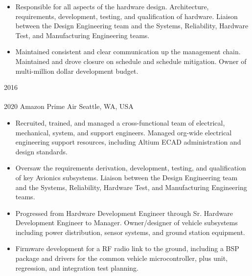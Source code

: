\begin{entrylist}
{\begin{itemize}[leftmargin=12pt]
  \item Responsible for all aspects of the hardware design. Architecture, requirements, development, testing, and qualification of hardware. Liaison between the Design Engineering team and the Systems, Reliability, Hardware Test, and Manufacturing Engineering teams.
  \item Maintained consistent and clear communication up the management chain. Maintained and drove closure on schedule and schedule mitigation. Owner of multi-million dollar development budget. 
\end{itemize}
}
\entry
  {2016\\\faChevronDown\\2020}
  {Amazon Prime Air}
  {Seattle, WA, USA}
  {
\begin{itemize}[leftmargin=12pt]
  \item Recruited, trained, and managed a cross-functional team of electrical, mechanical, system, and support engineers. Managed org-wide electrical engineering support resources, including Altium ECAD administration and design standards.
  \item Oversaw the requirements derivation, development, testing, and qualification of key Avionics subsystems. Liaison between the Design Engineering team and the Systems, Reliability, Hardware Test, and Manufacturing Engineering teams.
  \item Progressed from Hardware Development Engineer through Sr. Hardware Development Engineer to Manager. Owner/designer of vehicle subsystems including power distribution, sensor systems, and ground station equipment.
  \item Firmware development for a RF radio link to the ground, including a BSP package and drivers for the common vehicle microcontroller, plus unit, regression, and integration test planning.
\end{itemize}
}

\end{entrylist}